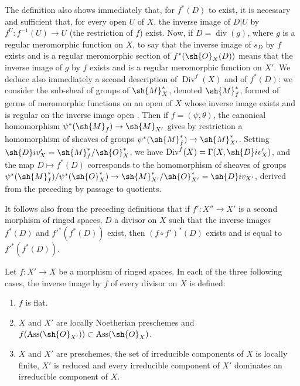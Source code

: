 \begin{env}[21.4.3]
\label{IV.21.4.3}
The definition  also shows immediately that, for $f^*(D)$ to exist, it is necessary and sufficient that, for every open $U$ of $X$, the inverse image of $D|U$ by $f^U:f^{-1}(U)\to U$ (the restriction of $f$) exist.
Now, if $D=\operatorname{div}(g)$, where $g$ is a regular meromorphic function on $X$, to say that the inverse image of $s_D$ by $f$ exists and is a regular meromorphic section of $f^*(\sh{O}_X(D))$ means  that the inverse image of $g$ by $f$ exists and is a regular meromorphic function on $X'$.
We deduce also immediately a second description of $\operatorname{Div}^f(X)$ and of $f^*(D)$: we consider the sub-sheaf of groups of $\sh{M}_X^*$, denoted $\sh{M}_f^*$, formed of germs of meromorphic functions on an open of $X$ whose inverse image exists and is regular on the inverse image open .
Then if $f=(\psi,\theta)$, the canonical homomorphism  $\psi^*(\sh{M}_f)\to\sh{M}_{X'}$ gives by restriction a homomorphism of sheaves of groups $\psi^*(\sh{M}_f^*)\to\sh{M}_{X'}^*$.
Setting $\sh{D}iv_X'=\sh{M}_f^*/\sh{O}_X^*$, we have $\operatorname{Div}^f(X)=\Gamma(X,\sh{D}iv_X')$, and the map $D\mapsto f^*(D)$ corresponds to the homomorphism of sheaves of groups $\psi^*(\sh{M}_f^*)/\psi^*(\sh{O}_X^*)\to\sh{M}_{X'}^*/\sh{O}_{X'}^*=\sh{D}iv_{X'}$, derived from the preceding by passage to quotients.
\end{env}

\begin{env}[21.4.4]
\label{IV.21.4.4}
It follows also from the preceding definitions that if $f':X''\to X'$ is a second morphism of ringed spaces, $D$ a divisor on $X$ such that the inverse images $f^*(D)$ and $f'^*(f^*(D))$ exist, then $(f\circ f')^*(D)$ exists and is equal to $f'^*(f^*(D))$.
\end{env}

\begin{proposition}[21.4.5]
\label{IV.21.4.5}
Let $f:X'\to X$ be a morphism of ringed spaces.
In each of the three following cases, the inverse image by $f$ of every divisor on $X$ is defined:
\begin{enumerate}[label=(\roman*)]
  \item $f$ is flat.
  \item $X$ and $X'$ are locally Noetherian preschemes and $f(\operatorname{Ass}(\sh{O}_{X'}))\subset\operatorname{Ass}(\sh{O}_X)$.
  \item $X$ and $X'$ are preschemes, the set of irreducible components of $X$ is locally finite, $X'$ is reduced and every irreducible component of $X'$ dominates an irreducible component of $X$.
\end{enumerate}
\end{proposition}

